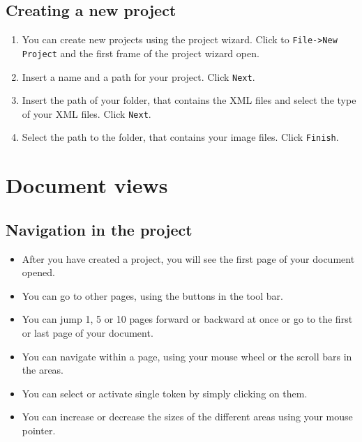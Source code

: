 \subsection{Creating a new project}
\begin{frame}

	\begin{enumerate}
		\item<1->	You can create new projects using the project wizard. Click to
				\texttt{File->New Project} and the first frame of the project wizard
					open.
		\item<2-> Insert a name and a path for your project. Click \texttt{Next}.
		\item<3-> Insert the path of your folder, that contains the XML files and
			select the type of your XML files. Click \texttt{Next}.
		\item<4-> Select the path to the folder, that contains your image
			files. Click \texttt{Finish}.
	\end{enumerate}
\end{frame}

\section{Document views}
\subsection{Navigation in the project}
\begin{frame}
	\begin{itemize}
		\item After you have created a project, you will see the first page of
			your document opened.
		\item You can go to other pages, using the buttons in the tool bar.
		\item You can jump 1, 5 or 10 pages forward or backward at once or go to
			the first or last page of your document.
		\item You can navigate within a page, using your mouse wheel or the
			scroll bars in the areas.
		\item You can select or activate single token by simply clicking on them.
		\item You can increase or decrease the sizes of the different areas using
			your mouse pointer.
	\end{itemize}
\end{frame}

